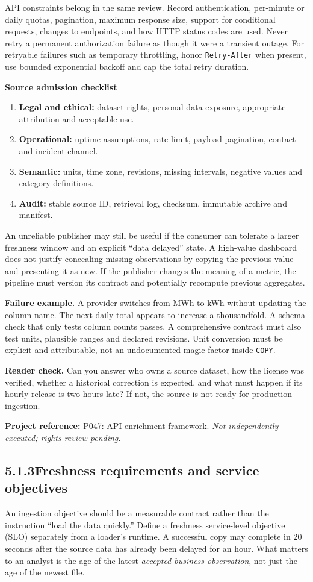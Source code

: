 \documentclass[11pt,twoside]{article}
\newcommand{\topic}[2]{\subsection*{#1\quad #2}}
\newcommand{\repo}[2]{\par\begingroup\fontsize{8.0}{9.6}\selectfont\sffamily\color{inkgray}\textbf{Project reference:} \href{#2}{#1}. \textit{Not independently executed; rights review pending.}\par\endgroup}
\begin{document}
API constraints belong in the same review. Record authentication, per-minute or daily quotas, pagination, maximum response size, support for conditional requests, changes to endpoints, and how HTTP status codes are used. Never retry a permanent authorization failure as though it were a transient outage. For retryable failures such as temporary throttling, honor \texttt{Retry-After} when present, use bounded exponential backoff and cap the total retry duration.

\begin{whitebox}\textbf{Source admission checklist}\par
\begin{enumerate}
\item \textbf{Legal and ethical:} dataset rights, personal-data exposure, appropriate attribution and acceptable use.
\item \textbf{Operational:} uptime assumptions, rate limit, payload pagination, contact and incident channel.
\item \textbf{Semantic:} units, time zone, revisions, missing intervals, negative values and category definitions.
\item \textbf{Audit:} stable source ID, retrieval log, checksum, immutable archive and manifest.
\end{enumerate}\end{whitebox}
An unreliable publisher may still be useful if the consumer can tolerate a larger freshness window and an explicit ``data delayed'' state. A high-value dashboard does not justify concealing missing observations by copying the previous value and presenting it as new. If the publisher changes the meaning of a metric, the pipeline must version its contract and potentially recompute previous aggregates.

\textbf{Failure example.} A provider switches from MWh to kWh without updating the column name. The next daily total appears to increase a thousandfold. A schema check that only tests column counts passes. A comprehensive contract must also test units, plausible ranges and declared revisions. Unit conversion must be explicit and attributable, not an undocumented magic factor inside \texttt{COPY}.

\textbf{Reader check.} Can you answer who owns a source dataset, how the license was verified, whether a historical correction is expected, and what must happen if its hourly release is two hours late? If not, the source is not ready for production ingestion.
\repo{P047: API enrichment framework}{https://github.com/Snowflake-Labs/sfguide-getting-started-with-api-enrichment-framework}
\newpage
\topic{5.1.3}{Freshness requirements and service objectives}
An ingestion objective should be a measurable contract rather than the instruction ``load the data quickly.'' Define a freshness service-level objective (SLO) separately from a loader's runtime. A successful copy may complete in 20 seconds after the source data has already been delayed for an hour. What matters to an analyst is the age of the latest \emph{accepted business observation}, not just the age of the newest file.
\end{document}
